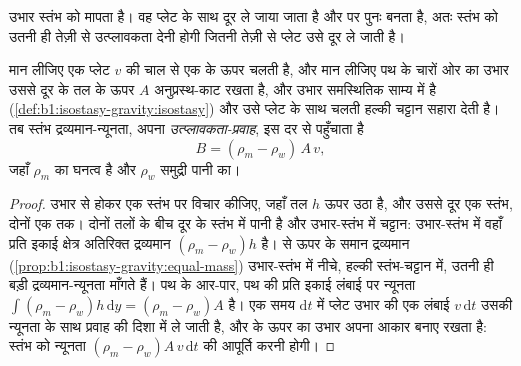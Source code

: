 उभार स्तंभ को मापता है। वह प्लेट के साथ दूर ले जाया जाता है और  पर पुनः बनता है, अतः स्तंभ को उतनी ही तेज़ी से उत्प्लावकता देनी होगी जितनी तेज़ी से प्लेट उसे दूर ले जाती है।

\begin{proposition}[स्तंभ का उत्प्लावकता-प्रवाह]
\label{prop:b1:hotspots:buoyancy}
मान लीजिए एक प्लेट $v$ की चाल से एक  के ऊपर चलती है, और मान लीजिए पथ के चारों ओर का उभार उससे दूर के तल के ऊपर $A$ अनुप्रस्थ-काट रखता है, और उभार समस्थितिक साम्य में है (\cref{def:b1:isostasy-gravity:isostasy}) और उसे प्लेट के साथ चलती हल्की चट्टान सहारा देती है। तब स्तंभ द्रव्यमान-न्यूनता, अपना \emph{उत्प्लावकता-प्रवाह}, इस दर से पहुँचाता है
\[
  B = (\rho_m - \rho_w)\,A\,v ,
\]
जहाँ $\rho_m$  का घनत्व है और $\rho_w$ समुद्री पानी का।
\end{proposition}

\begin{proof}
उभार से होकर एक स्तंभ पर विचार कीजिए, जहाँ तल $h$ ऊपर उठा है, और उससे दूर एक स्तंभ, दोनों एक  तक। दोनों तलों के बीच दूर के स्तंभ में पानी है और उभार-स्तंभ में चट्टान: उभार-स्तंभ में वहाँ प्रति इकाई क्षेत्र अतिरिक्त द्रव्यमान $(\rho_m - \rho_w)h$ है।  से ऊपर के समान द्रव्यमान (\cref{prop:b1:isostasy-gravity:equal-mass}) उभार-स्तंभ में नीचे, हल्की स्तंभ-चट्टान में, उतनी ही बड़ी द्रव्यमान-न्यूनता माँगते हैं। पथ के आर-पार, पथ की प्रति इकाई लंबाई पर न्यूनता $\int(\rho_m - \rho_w)h\,\mathrm dy = (\rho_m - \rho_w)A$ है। एक समय $\mathrm dt$ में प्लेट उभार की एक लंबाई $v\,\mathrm dt$ उसकी न्यूनता के साथ प्रवाह की दिशा में ले जाती है, और  के ऊपर का उभार अपना आकार बनाए रखता है: स्तंभ को न्यूनता $(\rho_m - \rho_w)A\,v\,\mathrm dt$ की आपूर्ति करनी होगी।
\end{proof}

